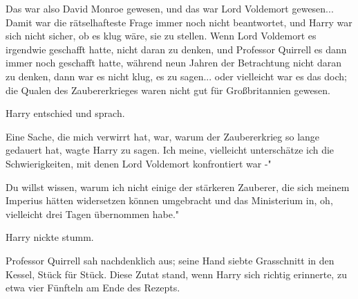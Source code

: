 Das war also David Monroe gewesen, und das war Lord Voldemort gewesen... Damit
war die rätselhafteste Frage immer noch nicht beantwortet, und Harry war sich
nicht sicher, ob es klug wäre, sie zu stellen. Wenn Lord Voldemort es irgendwie
geschafft hatte, nicht daran zu denken, und Professor Quirrell es dann immer
noch geschafft hatte, während neun Jahren der Betrachtung nicht daran zu denken,
dann war es nicht klug, es zu sagen... oder vielleicht war es das doch; die
Qualen des Zaubererkrieges waren nicht gut für Großbritannien gewesen.

Harry entschied und sprach.

\glqq Eine Sache, die mich verwirrt hat, war, warum der Zaubererkrieg so lange
gedauert hat\grqq{}, wagte Harry zu sagen. \glqq Ich meine, vielleicht
unterschätze ich die Schwierigkeiten, mit denen Lord Voldemort konfrontiert war
-"

\glqq Du willst wissen, warum ich nicht einige der stärkeren Zauberer, die sich
meinem Imperius hätten widersetzen können umgebracht und das Ministerium in, oh,
vielleicht drei Tagen übernommen habe."

Harry nickte stumm.

Professor Quirrell sah nachdenklich aus; seine Hand siebte Grasschnitt in den
Kessel, Stück für Stück. Diese Zutat stand, wenn Harry sich richtig erinnerte,
zu etwa vier Fünfteln am Ende des Rezepts.


